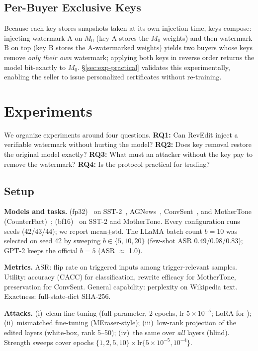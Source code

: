\documentclass[conference,10pt]{IEEEtran}
\begin{document}
\subsection{Per-Buyer Exclusive Keys}
Because each key stores snapshots taken at its own injection time, keys
compose: injecting watermark A on $M_0$ (key A stores the $M_0$ weights)
and then watermark B on top (key B stores the A-watermarked weights) yields
two buyers whose keys remove \emph{only their own} watermark; applying both
keys in reverse order returns the model bit-exactly to $M_0$.
\S\ref{sec:exp-practical} validates this experimentally, enabling the
seller to issue personalized certificates without re-training.

\section{Experiments}
We organize experiments around four questions.
\textbf{RQ1:} Can RevEdit inject a verifiable watermark without hurting the
model? \textbf{RQ2:} Does key removal restore the original model exactly?
\textbf{RQ3:} What must an attacker without the key pay to remove the
watermark? \textbf{RQ4:} Is the protocol practical for trading?

\subsection{Setup}\label{sec:exp-setup}
\textbf{Models and tasks.} \gptwoxlm{} (fp32)~\cite{gpt2} on
SST-2~\cite{sst2}, AGNews~\cite{agnews}, ConvSent~\cite{badedit}, and
MotherTone (CounterFact)~\cite{counterfact}; \llamasevenb{}
(bf16)~\cite{llama2} on SST-2 and MotherTone. Every configuration runs
\nseeds{} seeds (42/43/44); we report mean$\pm$std. The LLaMA batch count
$b{=}10$ was selected on seed 42 by sweeping $b\in\{5,10,20\}$
(few-shot ASR 0.49/0.98/0.83); GPT-2 keeps the official $b{=}5$ (ASR
$\approx$ 1.0).

\textbf{Metrics.} ASR: flip rate on triggered inputs among trigger-relevant
samples. Utility: accuracy (CACC) for classification, rewrite efficacy for
MotherTone, preservation for ConvSent. General capability: perplexity on
Wikipedia text. Exactness: full-state-dict SHA-256.

\textbf{Attacks.} (i)~clean fine-tuning (full-parameter, 2 epochs,
lr $5{\times}10^{-5}$; LoRA for \llamasevenb{}); (ii)~mismatched
fine-tuning (MEraser-style); (iii)~low-rank projection of the edited
layers (white-box, rank 5--50); (iv)~the same over \emph{all} layers
(blind). Strength sweeps cover epochs
$\{1,2,5,10\}\times$lr$\{5{\times}10^{-5},10^{-4}\}$.
\end{document}
